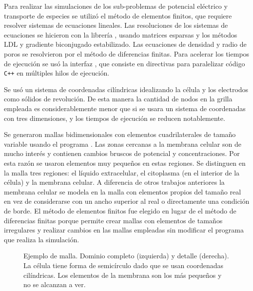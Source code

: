 Para realizar las simulaciones de los sub-problemas de potencial eléctrico y transporte de especies se utilizó el método de elementos finitos, que requiere resolver sistemas de ecuaciones lineales. Las resoluciones de los sistemas de ecuaciones se hicieron con la librería , usando matrices esparsas y los métodos LDL y gradiente biconjugado estabilizado. Las ecuaciones de densidad y radio de poros se resolvieron por el método de diferencias finitas. Para acelerar los tiempos de ejecución se usó la interfaz , que consiste en directivas para paralelizar código \texttt{C++} en múltiples hilos de ejecución. 

Se usó un sistema de coordenadas cilíndricas idealizando la célula y los electrodos como sólidos de revolución. De esta manera la cantidad de nodos en la grilla empleada es considerablemente menor que si se usara un sistema de coordenadas con tres dimensiones, y los tiempos de ejecución se reducen notablemente. 

Se generaron mallas bidimensionales con elementos cuadrilaterales de tamaño variable usando el programa . Las zonas cercanas a la membrana celular son de mucho interés y contienen cambios bruscos de potencial y concentraciones. Por esta razón se usaron elementos muy pequeños en estas regiones. Se distinguen en la malla tres regiones: el líquido extracelular, el citoplasma (en el interior de la célula) y la membrana celular. A diferencia de otros trabajos anteriores la membrana celular se modela en la malla con elementos propios del tamaño real en vez de considerarse con un ancho superior al real o directamente una condición de borde. El método de elementos finitos fue elegido en lugar de el método de diferencias finitas porque permite crear mallas con elementos de tamaños irregulares y realizar cambios en las mallas empleadas sin modificar el programa que realiza la simulación.

\begin{figure} 
\caption{Ejemplo de malla. Dominio completo (izquierda) y detalle (derecha). La célula tiene forma de semicírculo dado que se usan coordenadas cilíndricas. Los elementos de la membrana son los más pequeños y no se alcanzan a ver.}
\end{figure}


